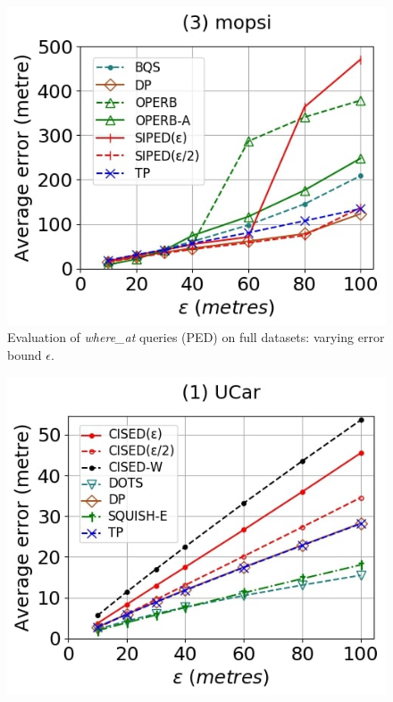 {\begin{figure}[tb!]
	\includegraphics[scale = 0.25]{Figures/Exp-where-PED-error-epsilon-mopsi.jpg}
	\vspace{-2ex}
	\caption{\small Evaluation of {\emph{where\_at}} queries (PED) on full datasets: varying error bound $\epsilon$.}
	\label{fig:query-ped-epsilon}
	\vspace{-1.0ex}
\end{figure}
\begin{figure}[tb!]
	\centering
	\includegraphics[scale = 0.250]{Figures/Exp-where-SED-error-epsilon-service.jpg}\hspace{0.5ex}

\end{figure}}
